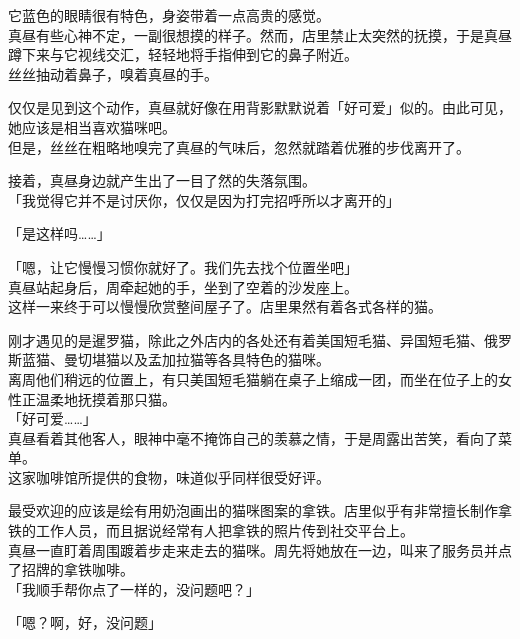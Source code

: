 它蓝色的眼睛很有特色，身姿带着一点高贵的感觉。\\

真昼有些心神不定，一副很想摸的样子。然而，店里禁止太突然的抚摸，于是真昼蹲下来与它视线交汇，轻轻地将手指伸到它的鼻子附近。\\

丝丝抽动着鼻子，嗅着真昼的手。

仅仅是见到这个动作，真昼就好像在用背影默默说着「好可爱」似的。由此可见，她应该是相当喜欢猫咪吧。\\

但是，丝丝在粗略地嗅完了真昼的气味后，忽然就踏着优雅的步伐离开了。

接着，真昼身边就产生出了一目了然的失落氛围。\\

「我觉得它并不是讨厌你，仅仅是因为打完招呼所以才离开的」

「是这样吗……」

「嗯，让它慢慢习惯你就好了。我们先去找个位置坐吧」\\

真昼站起身后，周牵起她的手，坐到了空着的沙发座上。\\

这样一来终于可以慢慢欣赏整间屋子了。店里果然有着各式各样的猫。

刚才遇见的是暹罗猫，除此之外店内的各处还有着美国短毛猫、异国短毛猫、俄罗斯蓝猫、曼切堪猫以及孟加拉猫等各具特色的猫咪。\\

离周他们稍远的位置上，有只美国短毛猫躺在桌子上缩成一团，而坐在位子上的女性正温柔地抚摸着那只猫。\\

「好可爱……」\\

真昼看着其他客人，眼神中毫不掩饰自己的羡慕之情，于是周露出苦笑，看向了菜单。\\

这家咖啡馆所提供的食物，味道似乎同样很受好评。

最受欢迎的应该是绘有用奶泡画出的猫咪图案的拿铁。店里似乎有非常擅长制作拿铁的工作人员，而且据说经常有人把拿铁的照片传到社交平台上。\\

真昼一直盯着周围踱着步走来走去的猫咪。周先将她放在一边，叫来了服务员并点了招牌的拿铁咖啡。\\

「我顺手帮你点了一样的，没问题吧？」

「嗯？啊，好，没问题」\\

